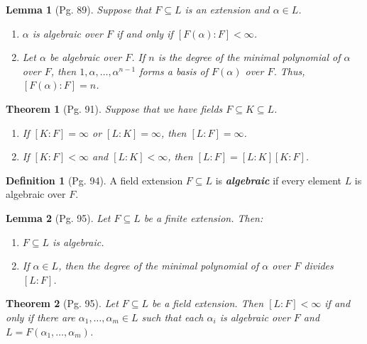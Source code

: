 \documentclass[leqno]{article}
\newtheorem{theorem}{Theorem}
\newtheorem{lemma}{Lemma}
\theoremstyle{definition}
\newtheorem{definition}{Definition}
\theoremstyle{remark}
\theoremstyle{definition}
\begin{document}
    \begin{lemma}[Pg. 89]\label{lem:8}
        Suppose that $F\subseteq L$ is an extension and $\alpha\in L$.
            \begin{enumerate}[label=\normalfont{(\alph*)}]
                \item $\alpha$ is algebraic over $F$ if and only if $[F(\alpha)\colon F]<\infty$.
                \item Let $\alpha$ be algebraic over $F$. If $n$ is the degree of the minimal polynomial of $\alpha$ over $F$, then $1,\alpha,\dots,\alpha^{n-1}$ forms a basis of $F(\alpha)$ over $F$. Thus, $[F(\alpha)\colon F]=n$.
            \end{enumerate}
    \end{lemma}
    \begin{theorem}[Pg. 91]\label{thm:1}
        Suppose that we have fields $F\subseteq K\subseteq L$.
            \begin{enumerate}[label=\normalfont{(\alph*)}]
                \item If $[K\colon F]=\infty$ or $[L\colon K]=\infty$, then $[L\colon F]=\infty$.
                \item If $[K\colon F]<\infty$ and $[L\colon K]<\infty$, then $[L\colon F]=[L\colon K][K\colon F]$.
            \end{enumerate}
    \end{theorem}
    \begin{definition}[Pg. 94]\label{def:5}
        A field extension $F\subseteq L$ is \textbf{\textit{algebraic}} if every element $L$ is algebraic over $F$.
    \end{definition}\newpage
    \begin{lemma}[Pg. 95]\label{lem:9}
        Let $F\subseteq L$ be a finite extension. Then:
            \begin{enumerate}[label=\normalfont{(\alph*)}]
                \item $F\subseteq L$ is algebraic.
                \item If $\alpha\in L$, then the degree of the minimal polynomial of $\alpha$ over $F$ divides $[L\colon F]$.
            \end{enumerate}
    \end{lemma}
    \begin{theorem}[Pg. 95]\label{thm:2}
        Let $F\subseteq L$ be a field extension. Then $[L\colon F]<\infty$ if and only if there are $\alpha_1,\dots,\alpha_m\in L$ such that each $\alpha_i$ is algebraic over $F$ and $L=F(\alpha_1,\dots,\alpha_m)$.
    \end{theorem}
\end{document}
